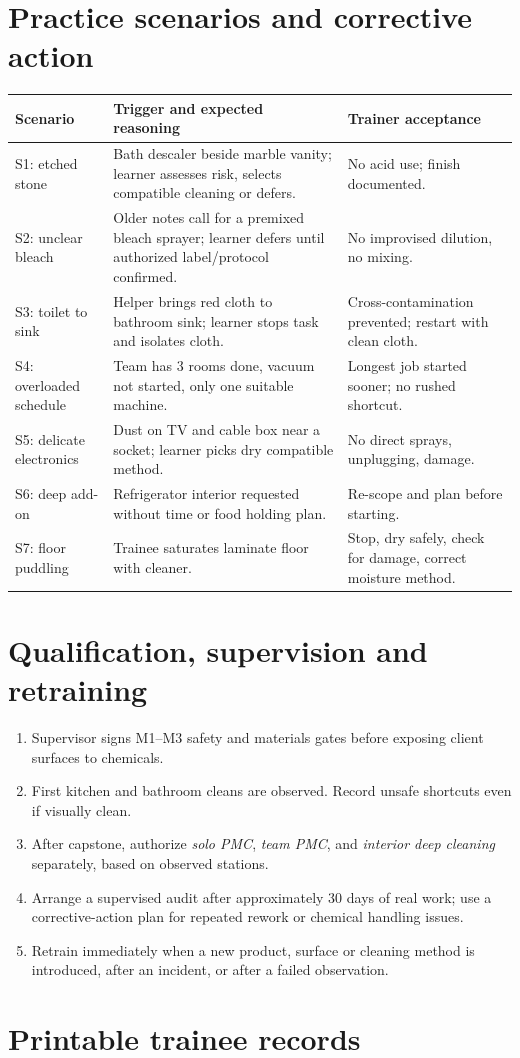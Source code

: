 \documentclass[10pt,letterpaper,oneside]{article}
\newcommand{\smalltable}{\par\small\renewcommand{\arraystretch}{1.24}}
\newcommand{\restorenormalfonttable}{\par\normalsize\renewcommand{\arraystretch}{1}}
\begin{document}
\section{Practice scenarios and corrective action}
\smalltable\begin{longtable}{p{.19\linewidth}p{.42\linewidth}p{.28\linewidth}}\toprule
Scenario & Trigger and expected reasoning & Trainer acceptance\\\midrule\endhead
S1: etched stone & Bath descaler beside marble vanity; learner assesses risk, selects compatible cleaning or defers. & No acid use; finish documented.\\
S2: unclear bleach & Older notes call for a premixed bleach sprayer; learner defers until authorized label/protocol confirmed. & No improvised dilution, no mixing.\\
S3: toilet to sink & Helper brings red cloth to bathroom sink; learner stops task and isolates cloth. & Cross-contamination prevented; restart with clean cloth.\\
S4: overloaded schedule & Team has 3 rooms done, vacuum not started, only one suitable machine. & Longest job started sooner; no rushed shortcut.\\
S5: delicate electronics & Dust on TV and cable box near a socket; learner picks dry compatible method. & No direct sprays, unplugging, damage.\\
S6: deep add-on & Refrigerator interior requested without time or food holding plan. & Re-scope and plan before starting.\\
S7: floor puddling & Trainee saturates laminate floor with cleaner. & Stop, dry safely, check for damage, correct moisture method.\\\bottomrule\end{longtable}\restorenormalfonttable
\section{Qualification, supervision and retraining}
\begin{enumerate}
\item Supervisor signs M1--M3 safety and materials gates before exposing client surfaces to chemicals.
\item First kitchen and bathroom cleans are observed. Record unsafe shortcuts even if visually clean.
\item After capstone, authorize \emph{solo PMC}, \emph{team PMC}, and \emph{interior deep cleaning} separately, based on observed stations.
\item Arrange a supervised audit after approximately 30 days of real work; use a corrective-action plan for repeated rework or chemical handling issues.
\item Retrain immediately when a new product, surface or cleaning method is introduced, after an incident, or after a failed observation.
\end{enumerate}
\newpage\section{Printable trainee records}
\end{document}
